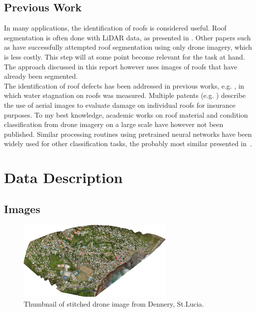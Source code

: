 \documentclass[11pt]{article}
\begin{document}
	\subsection{Previous Work}
	
	In many applications, the identification of roofs is considered useful. Roof segmentation is often done with LiDAR data, as presented in \cite{Chen2012}. Other papers such as \cite{Soman2019} have successfully attempted roof segmentation using only drone imagery, which is less costly. This step will at some point become relevant for the task at hand. The approach discussed in this report however uses images of roofs that have already been segmented.\\
	
	The identification of roof defects has been addressed in previous works, e.g. \cite{Yudin2018}, in which water stagnation on roofs was measured. Multiple patents (e.g. \cite{Shreve2017}) describe the use of aerial images to evaluate damage on individual roofs for insurance purposes. To my best knowledge, academic works on roof material and condition classification from drone imagery on a large scale have however not been published. Similar processing routines using pretrained neural networks have been widely used for other classification tasks, the probably most similar presented in~\cite{Marmanis2015}.
	
	\section{Data Description}
	
	\subsection{Images}
		
	\begin{figure}
		\centering		
		\includegraphics[width=0.68\textwidth]{figures/thumbnail_dennery.png}
		\caption{Thumbnail of stitched drone image from Dennery, St.Lucia.}
		\label{fig:thumbnail_dennery}
	\end{figure}
\end{document}
